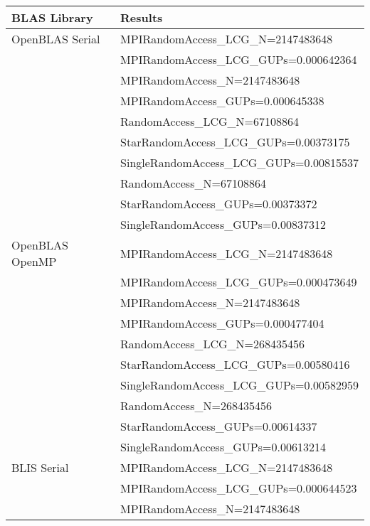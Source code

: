 \begin{table}[]
\begin{center}
\begin{tabular}{ |l|l| } 
\hline
\textbf{BLAS Library} & \textbf{Results} \\ 
\hline
OpenBLAS Serial & MPIRandomAccess\_LCG\_N=2147483648 \\
                & MPIRandomAccess\_LCG\_GUPs=0.000642364 \\
                \cline{2-2} 
                & MPIRandomAccess\_N=2147483648 \\
                & MPIRandomAccess\_GUPs=0.000645338 \\
                \cline{2-2} 
                & RandomAccess\_LCG\_N=67108864 \\
                & StarRandomAccess\_LCG\_GUPs=0.00373175 \\
                & SingleRandomAccess\_LCG\_GUPs=0.00815537 \\
                \cline{2-2} 
                & RandomAccess\_N=67108864 \\
                & StarRandomAccess\_GUPs=0.00373372 \\
                & SingleRandomAccess\_GUPs=0.00837312 \\ 
\hline
OpenBLAS OpenMP & MPIRandomAccess\_LCG\_N=2147483648 \\
                & MPIRandomAccess\_LCG\_GUPs=0.000473649 \\
                \cline{2-2} 
                & MPIRandomAccess\_N=2147483648 \\
                & MPIRandomAccess\_GUPs=0.000477404 \\
                \cline{2-2} 
                & RandomAccess\_LCG\_N=268435456 \\
                & StarRandomAccess\_LCG\_GUPs=0.00580416 \\
                & SingleRandomAccess\_LCG\_GUPs=0.00582959 \\
                \cline{2-2} 
                & RandomAccess\_N=268435456 \\
                & StarRandomAccess\_GUPs=0.00614337 \\
                & SingleRandomAccess\_GUPs=0.00613214 \\
\hline
BLIS Serial     & MPIRandomAccess\_LCG\_N=2147483648 \\
                & MPIRandomAccess\_LCG\_GUPs=0.000644523 \\
                \cline{2-2} 
                & MPIRandomAccess\_N=2147483648 \\

\end{tabular}
\end{center}
\end{table}
